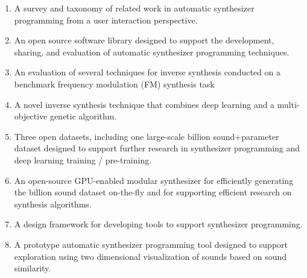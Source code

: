 \begin{enumerate}
    \item A survey and taxonomy of related work in automatic synthesizer programming from a user interaction perspective.
    \item An open source software library designed to support the development, sharing, and evaluation of automatic synthesizer programming techniques.
    \item An evaluation of several techniques for inverse synthesis conducted on a benchmark frequency modulation (FM) synthesis task
    \item A novel inverse synthesis technique that combines deep learning and a multi-objective genetic algorithm.
    \item Three open datasets, including one large-scale billion sound+parameter dataset designed to support further research in synthesizer programming and deep learning training / pre-training.
    \item An open-source GPU-enabled modular synthesizer for efficiently generating the billion sound dataset on-the-fly and for supporting efficient research on synthesis algorithms.
    \item A design framework for developing tools to support synthesizer programming.
    \item A prototype automatic synthesizer programming tool designed to support exploration using two dimensional visualization of sounds based on sound similarity.
\end{enumerate}

